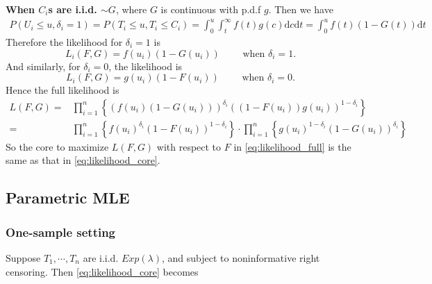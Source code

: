 \documentclass[a4paper,12pt]{article}
\begin{document}
\textbf{When $C_i$s are i.i.d. $\sim G$}, where $G$ is continuous with p.d.f $g$. Then we have
\[
  \begin{aligned}
    P\left(U_i \leq u, \delta_i = 1\right) = P\left(T_i \leq u, T_i \leq C_i\right)
    = \int_0^u\int_t^\infty f\left(t\right)g\left(c\right)\mathrm{d}c\mathrm{d}t
    = \int_0^uf\left(t\right)\left(1 - G\left(t\right)\right)\mathrm{d}t
  \end{aligned}
\]
Therefore the likelihood for $\delta_i = 1$ is
\[
  L_i\left(F, G\right) = f\left(u_i\right)\left(1 - G\left(u_i\right)\right)
  \quad\quad \text{ when } \delta_i = 1
  .
\]
And similarly, for $\delta_i = 0$, the likelihood is
\[
  L_i\left(F, G\right) = g\left(u_i\right)\left(1 - F\left(u_i\right)\right)
  \quad\quad \text{ when } \delta_i = 0
  .
\]
Hence the full likelihood is
\begin{equation}
  \label{eq:likelihood_full}
  \begin{aligned}
    L\left(F, G\right)
    =& \prod\limits_{i = 1}^n\left\{
      \left(f\left(u_i\right)\left(1 - G\left(u_i\right)\right)\right)^{\delta_i}
      \left(\left(1 - F\left(u_i\right)\right)g\left(u_i\right)\right)^{1 - \delta_i}
    \right\}    \\
    =& \prod\limits_{i = 1}^n\left\{
      f\left(u_i\right)^{\delta_i}\left(1 - F\left(u_i\right)\right)^{1 - \delta_i}
    \right\}
    \cdot \prod\limits_{i = 1}^n\left\{
      g\left(u_i\right)^{1 - \delta_i}\left(1 - G\left(u_i\right)\right)^{\delta_i}
    \right\}
  \end{aligned}
\end{equation}
So the core to maximize $L\left(F, G\right)$ with respect to $F$ in \eqref{eq:likelihood_full} is the same as that in \eqref{eq:likelihood_core}.

\subsection{Parametric MLE}
\label{sec:parametric-mle}

\subsubsection{One-sample setting}
\label{sec:one-sample-setting}

Suppose $T_1, \cdots, T_n$ are i.i.d. $Exp\left(\lambda\right)$, and subject to noninformative right censoring. Then \eqref{eq:likelihood_core} becomes
\end{document}
